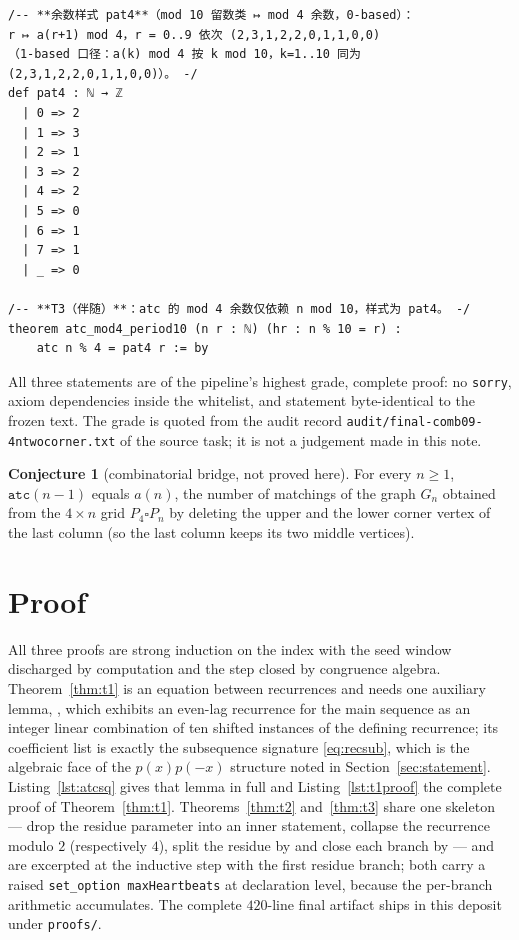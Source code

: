 \documentclass[11pt]{article}
\theoremstyle{definition}
\newtheorem{conjecture}{Conjecture}
\begin{document}
\begin{lstlisting}[caption={The mod-4 pattern \lean{pat4} and the formal
statement of Theorem~\ref{thm:t3}, verbatim from the frozen statement file
(lines 110--126, sha256 \texttt{4cb10838}).},label={lst:t3blk}]
/-- **余数样式 pat4**（mod 10 留数类 ↦ mod 4 余数，0-based）：
r ↦ a(r+1) mod 4，r = 0..9 依次 (2,3,1,2,2,0,1,1,0,0)
（1-based 口径：a(k) mod 4 按 k mod 10，k=1..10 同为 (2,3,1,2,2,0,1,1,0,0)）。 -/
def pat4 : ℕ → ℤ
  | 0 => 2
  | 1 => 3
  | 2 => 1
  | 3 => 2
  | 4 => 2
  | 5 => 0
  | 6 => 1
  | 7 => 1
  | _ => 0

/-- **T3（伴随）**：atc 的 mod 4 余数仅依赖 n mod 10，样式为 pat4。 -/
theorem atc_mod4_period10 (n r : ℕ) (hr : n % 10 = r) :
    atc n % 4 = pat4 r := by
\end{lstlisting}

All three statements are of the pipeline's highest grade, complete proof: no
\texttt{sorry}, axiom dependencies inside the whitelist, and statement
byte-identical to the frozen text. The grade is quoted from the audit record
\texttt{audit/final-comb09-4ntwocorner.txt} of the source task; it is not a
judgement made in this note.

\begin{conjecture}[combinatorial bridge, not proved here]\label{conj:bridge}
For every $n \ge 1$, $\texttt{atc}(n-1)$ equals $a(n)$, the number of matchings
of the graph $G_n$ obtained from the $4 \times n$ grid $P_4 \square P_n$ by
deleting the upper and the lower corner vertex of the last column (so the last
column keeps its two middle vertices).
\end{conjecture}

\section{Proof}\label{sec:proof}

All three proofs are strong induction on the index with the seed window
discharged by computation and the step closed by congruence algebra.
Theorem~\ref{thm:t1} is an equation between recurrences and needs one auxiliary
lemma, , which exhibits an even-lag recurrence for the main
sequence as an integer linear combination of ten shifted instances of the
defining recurrence; its coefficient list is exactly the subsequence signature
\eqref{eq:recsub}, which is the algebraic face of the $p(x)p(-x)$ structure
noted in Section~\ref{sec:statement}. Listing~\ref{lst:atcsq} gives that lemma
in full and Listing~\ref{lst:t1proof} the complete proof of
Theorem~\ref{thm:t1}. Theorems~\ref{thm:t2} and~\ref{thm:t3} share one
skeleton --- drop the residue parameter into an inner statement, collapse the
recurrence modulo $2$ (respectively $4$), split the residue by 
and close each branch by  --- and are excerpted at the inductive
step with the first residue branch; both carry a raised
\texttt{set\_option maxHeartbeats} at declaration level, because the per-branch
arithmetic accumulates. The complete $420$-line final artifact ships in this
deposit under \texttt{proofs/}.
\end{document}

